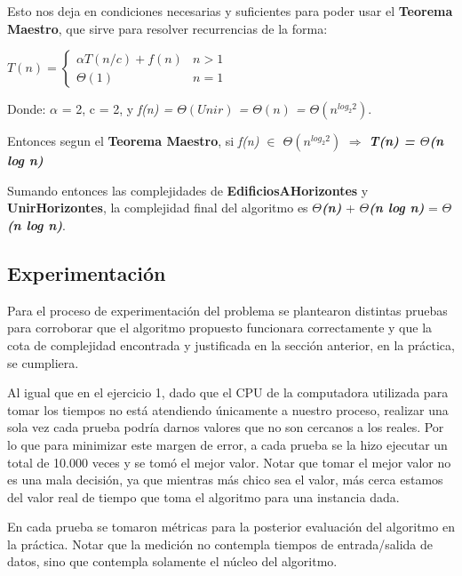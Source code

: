 \begin{enumerate}
Esto nos deja en condiciones necesarias y suficientes para poder usar el \textbf{Teorema Maestro}, que sirve para resolver recurrencias de la forma:

\bigskip
$T(n) =\begin{cases} \alpha T(n/c) + f(n) & n > 1 \\ \Theta(1) & n = 1 \end{cases}$

\bigskip
Donde: $\alpha$ = 2, c = 2, y \textit{f(n) =  $\Theta(Unir)$ = $\Theta(n)$ = $\Theta(n^{log_{2}2})$}.

\bigskip
Entonces segun el \textbf{Teorema Maestro}, si \textit{f(n) $\in$ $\Theta(n^{log_{2}2})$} $\Rightarrow$ \textbf{\textit{T(n) = $\Theta$(n log n)}}
\end{enumerate}

\bigskip

Sumando entonces las complejidades de \textbf{EdificiosAHorizontes} y \textbf{UnirHorizontes}, la complejidad final del algoritmo es \textbf{$\Theta$\textit{(n)}} + \textbf{$\Theta$\textit{(n log n)}} = \textbf{$\Theta$\textit{(n log n)}}.

\newpage

\subsection{Experimentación}

Para el proceso de experimentación del problema se plantearon distintas pruebas para corroborar que el algoritmo propuesto funcionara correctamente y que la cota de complejidad encontrada y justificada en la sección anterior, en la práctica, se cumpliera.

Al igual que en el ejercicio 1, dado que el CPU de la computadora utilizada para tomar los tiempos no está atendiendo únicamente a nuestro proceso, realizar una sola vez cada prueba podría darnos valores que no son cercanos a los reales. Por lo que para minimizar este margen de error, a cada prueba se la hizo ejecutar un total de 10.000 veces y se tomó el mejor valor. Notar que tomar el mejor valor no es una mala decisión, ya que mientras más chico sea el valor, más cerca estamos del valor real de tiempo que toma el algoritmo para una instancia dada.

En cada prueba se tomaron métricas para la posterior evaluación del algoritmo en la práctica. Notar que la medición no contempla tiempos de entrada/salida de datos, sino que contempla solamente el núcleo del algoritmo.

